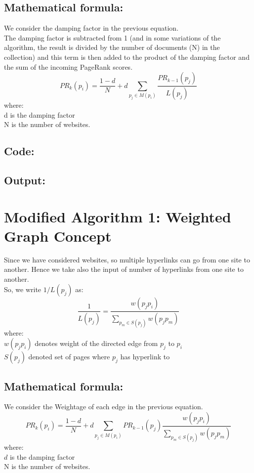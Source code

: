 \documentclass[10pt,a4paper]{article}
\begin{document}
\subsection*{Mathematical formula: }
We consider the damping factor in the previous equation.\\
The damping factor is subtracted from 1 (and in some variations of the algorithm, the result is divided by the number of documents (N) in the collection) and this term is then added to the product of the damping factor and the sum of the incoming PageRank scores.
\begin{equation}
PR_k(p_i) = \frac{1-d}{N} + d \sum_{p_j \in M(p_i)} \frac{PR_{k-1}(p_j)}{L(p_j)}
\end{equation}
where:\\ 
    d is the damping factor\\
    N is the number of websites.
\newpage
\subsection*{Code:}
\lstset{style=mystyle}


\subsection*{Output: }

\lstset{style=mystyle}


\clearpage
\section{Modified Algorithm 1: Weighted Graph Concept}
Since we have considered websites, so multiple hyperlinks can go from one site to another. Hence we take also the input of number of hyperlinks from one site to another.\\ 
So, we write $1/L(p_j)$ as:
\begin{equation}
\frac{1}{L(p_j)} = \frac{w(p_jp_i)}{\sum_{p_m \in S(p_j)}{w(p_jp_m)}}
\end{equation}
where:\\ 
    $w(p_jp_i)$ denotes weight of the directed edge from $p_j$ to $p_i$\\
    $S(p_j)$ denoted set of pages where $p_j$ has hyperlink to\\
\subsection*{Mathematical formula: }
We consider the Weightage of each edge in the previous equation.\\
\begin{equation}
PR_k(p_i) = \frac{1-d}{N} + d \sum_{p_j \in M(p_i)}{PR_{k-1}(p_j)}\frac{w(p_jp_i)}{\sum_{p_m \in S(p_j)}{w(p_jp_m)}}
\end{equation}
where:\\ 
    $d$ is the damping factor\\
    N is the number of websites.
\end{document}
